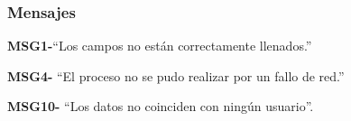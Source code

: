 \subsubsection{Mensajes}

\begin{Citemize}
	\item {\bf MSG1-}{``Los campos no están correctamente llenados.''}
	\item {\bf MSG4-}  ``El proceso no se pudo realizar por un fallo de red.''
	\item {\bf MSG10-}  ``Los datos no coinciden con ningún usuario''.
\end{Citemize}

